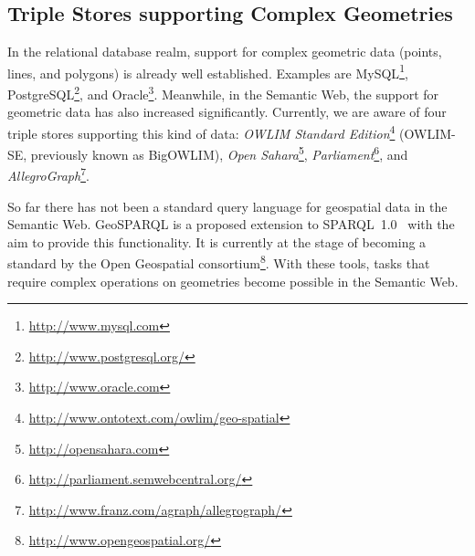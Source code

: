 
  
  
  
\subsection{Triple Stores supporting Complex Geometries}
\label{sec:geo-semantic-web}

In the relational database realm, support for complex geometric data
(points, lines, and polygons) is already well established. Examples are
MySQL\footnote{\url{http://www.mysql.com}},
PostgreSQL\footnote{\url{http://www.postgresql.org/}}, and
Oracle\footnote{\url{http://www.oracle.com}}.
Meanwhile, in the Semantic Web, the support for geometric data has also
increased significantly. Currently, we are aware of four triple stores
supporting this kind of data:
\emph{OWLIM Standard Edition}\footnote{\url{http://www.ontotext.com/owlim/geo-spatial}}
(OWLIM-SE, previously known as BigOWLIM),
\emph{Open Sahara}\footnote{\url{http://opensahara.com}},
\emph{Parliament}\footnote{\url{http://parliament.semwebcentral.org/}}, and
\emph{AllegroGraph}\footnote{\url{http://www.franz.com/agraph/allegrograph/}}. 

So far there has not been a standard query language for geospatial
data in the Semantic Web. GeoSPARQL is a proposed extension to
SPARQL~{1.0}~\cite{sparql} with the aim to provide this functionality.
It is currently at the stage of becoming a standard by the Open Geospatial consortium\footnote{\url{http://www.opengeospatial.org/}}.   
With these tools, tasks that require complex operations on geometries
become possible in the Semantic Web.
  
